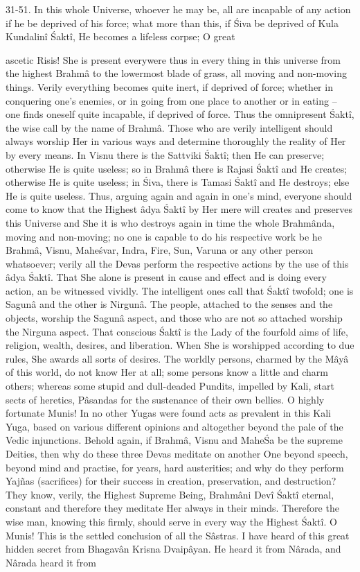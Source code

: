 31-51. In this whole Universe, whoever he may be, all are incapable of any action if he be deprived of his force; what more than this, if \'Siva be deprived of Kula Kundalin\^i \'Sakt\^i, He becomes a lifeless corpse; O great

ascetic Risis! She is present everywere thus in every thing in this universe from the highest Brahm\^a to the lowermost blade of grass, all moving and non-moving things. Verily everything becomes quite inert, if deprived of force; whether in conquering one's enemies, or in going from one place to another or in eating -- one finds oneself quite incapable, if deprived of force. Thus the omnipresent \'Sakt\^i, the wise call by the name of Brahm\^a. Those who are verily intelligent should always worship Her in various ways and determine thoroughly the reality of Her by every means. In Visnu there is the Sattviki \'Sakt\^i; then He can preserve; otherwise He is quite useless; so in Brahm\^a there is Rajasi \'Sakt\^i and He creates; otherwise He is quite useless; in \'Siva, there is Tamasi \'Sakt\^i and He destroys; else He is quite useless. Thus, arguing again and again in one's mind, everyone should come to know that the Highest \^adya \'Sakt\^i by Her mere will creates and preserves this Universe and She it is who destroys again in time the whole Brahm\^anda, moving and non-moving; no one is capable to do his respective work be he Brahm\^a, Visnu, Mahe\'svar, Indra, Fire, Sun, Varuna or any other person whatsoever; verily all the Devas perform the respective actions by the use of this \^adya \'Sakt\^i. That She alone is present in cause and effect and is doing every action, an be witnessed vividly. The intelligent ones call that \'Sakt\^i twofold; one is Sagun\^a and the other is Nirgun\^a. The people, attached to the senses and the objects, worship the Sagun\^a aspect, and those who are not so attached worship the Nirguna aspect. That conscious \'Sakt\^i is the Lady of the fourfold aims of life, religion, wealth, desires, and liberation. When She is worshipped according to due rules, She awards all sorts of desires. The worldly persons, charmed by the M\^ay\^a of this world, do not know Her at all; some persons know a little and charm others; whereas some stupid and dull-deaded Pundits, impelled by Kali, start sects of heretics, P\^asandas for the sustenance of their own bellies. O highly fortunate Munis! In no other Yugas were found acts as prevalent in this Kali Yuga, based on various different opinions and altogether beyond the pale of the Vedic injunctions. Behold again, if Brahm\^a, Visnu and Mahe\'Sa be the supreme Deities, then why do these three Devas meditate on another One beyond speech, beyond mind and practise, for years, hard austerities; and why do they perform Yajñas (sacrifices) for their success in creation, preservation, and destruction? They know, verily, the Highest Supreme Being, Brahm\^ani Dev\^i \'Sakt\^i eternal, constant and therefore they meditate Her always in their minds. Therefore the wise man, knowing this firmly, should serve in every way the Highest \'Sakt\^i. O Munis! This is the settled conclusion of all the S\^astras. I have heard of this great hidden secret from Bhagav\^an Krisna Dvaip\^ayan. He heard it from N\^arada, and N\^arada heard it from

